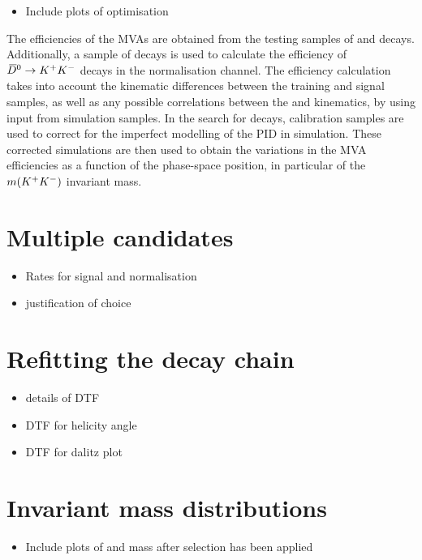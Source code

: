 {\color{Red}
\begin{itemize}
\item Include plots of optimisation
\end{itemize}
}

The efficiencies of the MVAs are obtained from the testing samples of \decay{\Bs}{\jpsi\phiz} and \decay{\Bs}{\Dsp\pim} decays. Additionally, a sample of \decay{\Bp}{\Dz\pip} decays is used to calculate the efficiency of ${{\kern 0.2em\overline{\kern -0.2em D}{}}{}^0} \rightarrow {\ensuremath{{K}^+}} {\ensuremath{{K}^-}}$ decays in the normalisation channel. The efficiency calculation takes into account the kinematic differences between the training and signal samples, as well as any possible correlations between the \Dsp and \phiz kinematics, by using input from simulation samples. In the search for \decay{\Bp}{\Dsp\Kp\Km} decays, calibration samples are used to correct for the imperfect modelling of the PID in simulation. These corrected simulations are then used to obtain the variations in the MVA efficiencies as a function of the phase-space position, in particular of the $m({{K}^+}{{K}^-})$ invariant mass.

\section{Multiple candidates}



{\color{Red}
\begin{itemize}
\item Rates for signal and normalisation
\item justification of choice
\end{itemize}
}

\section{Refitting the decay chain}
{\color{Red}
\begin{itemize}
\item details of DTF
\item DTF for helicity angle
\item DTF for dalitz plot
\end{itemize}
}


\section{Invariant mass distributions}

{\color{Red}
\begin{itemize}
\item Include plots of \Ds and \Kp\Km mass after selection has been applied 
\end{itemize}
}

